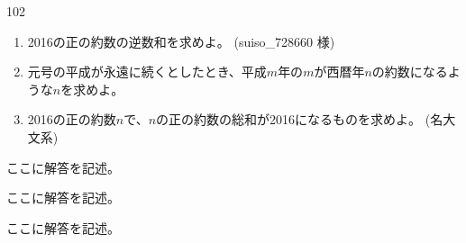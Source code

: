 \begin{prob}{102}{}{}
 \begin{enumerate}
  \item 2016の正の約数の逆数和を求めよ。  (suiso\_728660 様)
  \item 元号の平成が永遠に続くとしたとき、平成$m$年の$m$が西暦年$n$の約数になるような$n$を求めよ。 
  \item 2016の正の約数$n$で、$n$の正の約数の総和が2016になるものを求めよ。  (名大 文系)
 \end{enumerate}
\end{prob}
ここに解答を記述。

ここに解答を記述。

ここに解答を記述。
